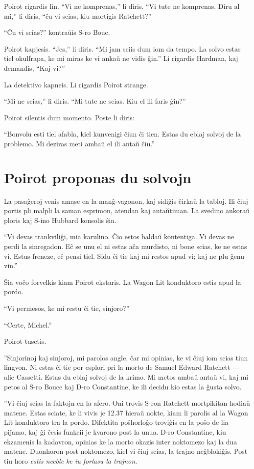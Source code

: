 Poirot rigardis lin. ``Vi ne komprenas,'' li diris. ``Vi tute ne komprenas. Diru al mi,'' li diris, ``ĉu vi scias, kiu mortigis Ratchett?''

``Ĉu vi scias?'' kontraŭis S-ro Bouc.

Poirot kapjesis. ``Jes,'' li diris. ``Mi jam sciis dum iom da tempo. La solvo estas tiel okulfrapa, ke mi miras ke vi ankaŭ ne vidis ĝin.'' Li rigardis Hardman, kaj demandis, ``Kaj vi?''

La detektivo kapneis. Li rigardis Poirot strange.

``Mi ne scias,'' li diris. ``Mi tute ne scias. Kiu el ili faris ĝin?''

Poirot silentis dum momento. Poste li diris:

``Bonvolu esti tiel afabla, kiel kunvenigi ĉiun ĉi tien. Estas du eblaj solvoj de la problemo. Mi deziras meti ambaŭ el ili antaŭ ĉiu.''

\chapter[Poirot proponas du solvojn]{Poirot proponas du solvojn}


La pasaĝeroj venis amase en la manĝ-vagonon, kaj sidiĝis ĉirkaŭ la tabloj. Ili ĉiuj portis pli malpli la saman esprimon, atendan kaj antaŭtiman. La svedino ankoraŭ ploris kaj S-ino Hubbard konsolis ŝin.

``Vi devas trankviliĝi, mia karulino. Ĉio estos baldaŭ kontentiga. Vi devas ne perdi la sinregadon. Eĉ se unu el ni estas aĉa murdisto, ni bone scias, ke ne estas vi. Estus freneze, eĉ pensi tiel. Sidu ĉi tie kaj mi restos apud vi; kaj ne plu ĝenu vin.''

Ŝia voĉo forvelkis kiam Poirot ekstaris. La Wagon Lit konduktoro estis apud la pordo.

``Vi permesos, ke mi restu ĉi tie, sinjoro?''

``Certe, Michel.''

Poirot tusetis.

''Sinjorinoj kaj sinjoroj, mi parolos angle, ĉar mi opinias, ke vi ĉiuj iom scias tiun lingvon. Ni estas ĉi tie por esplori pri la morto de Samuel Edward Ratchett --- alie Cassetti. Estas du eblaj solvoj de la krimo. Mi metos ambaŭ antaŭ vi, kaj mi petos al S-ro Bouce kaj D-ro Constantine, ke ili decidu kio estas la ĝusta solvo.

''Vi ĉiuj scias la faktojn en la afero. Oni trovis S-ron Ratchett mortpikitan hodiaŭ matene. Estas sciate, ke li vivis je 12.37 hieraŭ nokte, kiam li parolis al la Wagon Lit konduktoro tra la pordo. Difektita poŝhorloĝo troviĝis en la poŝo de lia piĵamo, kaj ĝi ĉesis funkcii je kvarono post la unua. D-ro Constantine, kiu ekzamenis la kadavron, opinias ke la morto okazis inter noktomezo kaj la dua matene. Duonhoron post noktomezo, kiel vi ĉiuj scias, la trajno neĝblokiĝis. Post tiu horo \emph{estis neeble ke iu forlasu la trajnon.}

